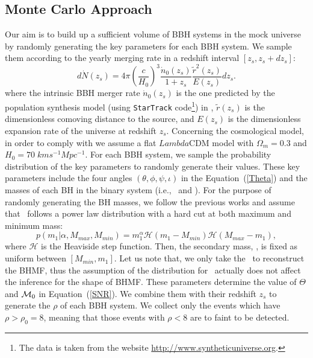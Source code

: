 \documentclass[twocolumn]{aastex62}
\begin{document}
\subsection{Monte Carlo Approach} \label{MC}

Our aim is to build up a sufficient volume of BBH systems in the mock universe by randomly generating the key parameters for each BBH system. We sample them according to the yearly merging rate in a redshift interval  $[z_{s}, z_{s}+dz_{s}]$:
 \begin{equation}
 d\dot{N} (z_s)=4\pi\left(\frac{c}{H_{0}}\right)^3\frac{\dot{n}_{0}(z_{s})}{1+z_{s}}\frac{\tilde{r}^2(z_{s})}{E(z_{s})}dz_{s}. 
 \end{equation}
where the intrinsic BBH merger rate $\dot{n}_{0}(z_{s})$ is the one predicted by the population synthesis model (using {\tt StarTrack} code\footnote{The data is taken from the website \url{http://www.syntheticuniverse.org}.}) in \citet{Dominik13}, $\tilde{r}(z_{s})$ is the dimensionless comoving distance to the source, and $E (z_s)$ is
the dimensionless expansion rate of the universe at redshift $z_s$. 
Concerning the cosmological model, in order to comply with \citet{Dominik13} we assume a flat $Lambda$CDM model with $\Omega_m = 0.3$ and $H_0 = 70 \; km s^{-1} Mpc^{-1}$.
For each BBH system, we sample the probability distribution of the key parameters to randomly generate their values. These key parameters include the four angles $(\theta, \phi, \psi, \iota)$ in the Equation~(\ref{Theta})  and the masses of each BH in the binary system (i.e., \mone\ and \mtwo).
For the purpose of randomly generating the BH masses, we follow the previous works \citep{Kovetz2017PhRvD, Abbott2018b, Fishbach2018} and assume that \mone\ follows a power law distribution with a hard cut at both maximum and minimum mass:
 \begin{equation} \label{equ_powlaw}
p(m_1|\alpha, M_{max}, M_{min}) = m_1^{\alpha} \mathcal{H}(m_1-M_{min}) \mathcal{H}(M_{max}-m_1),
 \end{equation}
where $\mathcal{H}$ is the Heaviside step function. Then, the secondary mass, \mtwo, is fixed as uniform between $[M_{min}, m_1]$. Let us note that, we only take the \mone\ to reconstruct the BHMF, thus the assumption of the distribution for \mtwo\ actually does not affect the inference for the shape of BHMF. These parameters determine the value of $\Theta$ and ${\cal M}_0$ in Equation~(\ref{SNR}). We combine them with their redshift $z_s$ to generate the $\rho$ of each BBH system. We collect only the events which have $\rho > \rho_0 = 8$, meaning that those events with $\rho < 8$ are to faint to be detected. 
\end{document}
